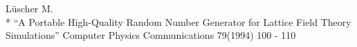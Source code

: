 \documentclass[letterpaper,12pt]{article}
\begin{document}
\begin{thebibliography}{99}





\begin{samepage}
  L\"uscher M.\\*
  ``A  Portable  High-Quality  Random  Number  Generator  for
  Lattice Field Theory Simulations''
  Computer Physics Communications 79(1994) 100 - 110
\end{samepage}



\end{thebibliography}
\end{document}
